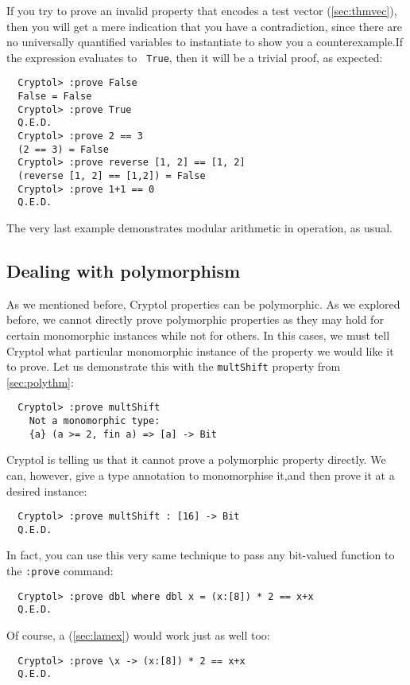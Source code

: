 If you try to prove an invalid property that encodes a test vector
(\autoref{sec:thmvec}), then you will get a mere indication that
you have a contradiction, since there are no universally quantified
variables to instantiate to show you a
counterexample.\indContradiction  If the expression evaluates to {\tt
  True}, then it will be a trivial proof, as expected:
\begin{Verbatim}
  Cryptol> :prove False
  False = False
  Cryptol> :prove True
  Q.E.D.
  Cryptol> :prove 2 == 3
  (2 == 3) = False
  Cryptol> :prove reverse [1, 2] == [1, 2]
  (reverse [1, 2] == [1,2]) = False
  Cryptol> :prove 1+1 == 0
  Q.E.D.
\end{Verbatim}
The very last example demonstrates modular arithmetic in operation, as
usual.\indModular

\subsection{Dealing with polymorphism}
\label{sec:deal-with-polym}

As we mentioned before, Cryptol properties can be polymorphic. As we
explored before, we cannot directly prove polymorphic properties as
they may hold for certain monomorphic instances while not for others.
In this cases, we must tell Cryptol what particular monomorphic
instance of the property we would like it to prove.  Let us
demonstrate this with the \texttt{multShift} property from
\autoref{sec:polythm}:
\begin{Verbatim}
  Cryptol> :prove multShift
    Not a monomorphic type:
    {a} (a >= 2, fin a) => [a] -> Bit
\end{Verbatim}
Cryptol is telling us that it cannot prove a polymorphic property
directly. We can, however, give a type annotation to monomorphise
it,\indTypeAnnotation and then prove it at a desired instance:
\begin{Verbatim}
  Cryptol> :prove multShift : [16] -> Bit
  Q.E.D.
\end{Verbatim}
In fact, you can use this very same technique to pass any bit-valued
function to the {\tt :prove} command:\indCmdProve\indWhere
\begin{Verbatim}
  Cryptol> :prove dbl where dbl x = (x:[8]) * 2 == x+x
  Q.E.D.
\end{Verbatim}
Of course, a \lamex (\autoref{sec:lamex}) would work just as well
too:\indLamExp
\begin{Verbatim}
  Cryptol> :prove \x -> (x:[8]) * 2 == x+x
  Q.E.D.
\end{Verbatim}

